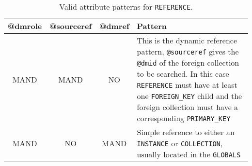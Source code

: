 \begin{table}[!htbp]
\small
\centering
\begin{tabulary}{\linewidth}{|c|c|c|J|}
    \hline 
        \textbf{@dmrole} &
        \textbf{@sourceref} &
        \textbf{@dmref} &
        \textbf{Pattern}\\
    \hline      \hline  
        MAND &           
        MAND &           
        NO &           
        This is the dynamic reference pattern, \texttt{@sourceref} gives the \texttt{@dmid} of the foreign collection to be searched. In this case \texttt{REFERENCE} must have at least one \texttt{FOREIGN\_KEY} child and the foreign collection must have a corresponding \texttt{PRIMARY\_KEY}\\
    \hline   
        MAND &           
        NO &           
        MAND &           
        Simple reference to either an \texttt{INSTANCE} or \texttt{COLLECTION}, usually located in the \texttt{GLOBALS}\\
   \hline 
\end{tabulary}
     \caption{Valid attribute patterns for  \texttt{REFERENCE}.}
     \label{tbl:reference-pattern}
\end{table}

